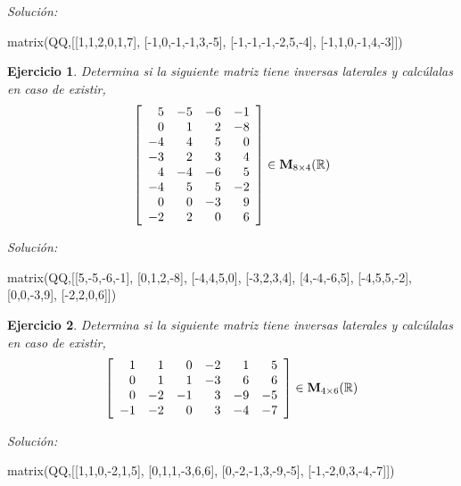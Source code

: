 \documentclass{amsart}
\newtheorem{ejer}{Ejercicio}
\begin{document}
{\it Soluci\'on:}

\begin{sageblock}
matrix(QQ,[[1,1,2,0,1,7],
[-1,0,-1,-1,3,-5],
[-1,-1,-1,-2,5,-4],
[-1,1,0,-1,4,-3]])
\end{sageblock}



\begin{ejer} Determina si la siguiente matriz tiene inversas laterales y calc\'ulalas en caso de existir,
\[ \left[\begin{array}{rrrr}
5 & -5 & -6 & -1 \\
0 & 1 & 2 & -8 \\
-4 & 4 & 5 & 0 \\
-3 & 2 & 3 & 4 \\
4 & -4 & -6 & 5 \\
-4 & 5 & 5 & -2 \\
0 & 0 & -3 & 9 \\
-2 & 2 & 0 & 6
\end{array}\right] \in {\bf M}_{8\times 4}({\mathbb R})\]
\end{ejer}

{\it Soluci\'on:}

\begin{sageblock}
matrix(QQ,[[5,-5,-6,-1],
[0,1,2,-8],
[-4,4,5,0],
[-3,2,3,4],
[4,-4,-6,5],
[-4,5,5,-2],
[0,0,-3,9],
[-2,2,0,6]])
\end{sageblock}



\begin{ejer} Determina si la siguiente matriz tiene inversas laterales y calc\'ulalas en caso de existir,
\[ \left[\begin{array}{rrrrrr}
1 & 1 & 0 & -2 & 1 & 5 \\
0 & 1 & 1 & -3 & 6 & 6 \\
0 & -2 & -1 & 3 & -9 & -5 \\
-1 & -2 & 0 & 3 & -4 & -7
\end{array}\right] \in {\bf M}_{4\times 6}({\mathbb R})\]
\end{ejer}

{\it Soluci\'on:}

\begin{sageblock}
matrix(QQ,[[1,1,0,-2,1,5],
[0,1,1,-3,6,6],
[0,-2,-1,3,-9,-5],
[-1,-2,0,3,-4,-7]])
\end{sageblock}
\end{document}
